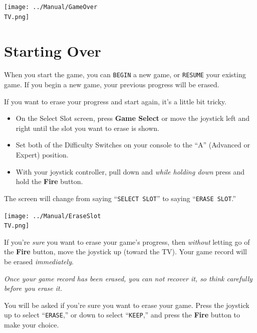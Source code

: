 \documentclass[10pt,twocolumn,openany,article]{memoir}
\newcommand\TV{NTSC}
\newcommand\TV{PAL}
\newcommand\TV{SECAM}
\begin{document}
\begin{description}
\begin{center}
  \texttt{[image: ../Manual/GameOver\\TV.png]}
\end{center}

\section{Starting Over}\label{Starting Your Adventure Over}

\ifdefined\NOSAVE

When  you  start  the  game,  you can  \texttt{BEGIN}  a  new  game,  or
\texttt{RESUME}  your existing  game.  If  you begin  a  new game,  your
previous progress will be erased.

\else

If  you want  to erase  your  progress and  start again,  it's a  little
bit tricky.

\begin{itemize}
\item On  the Select  Slot  screen,  press \textbf{Game  Select}  or move  the
  joystick left and right until the slot you want to erase is shown.
\item Set both  of the Difficulty Switches on your  console to the ``A''
  (Advanced or Expert) position.
\item With your  joystick controller, pull down  and \emph{while holding
    down} press and hold the \textbf{Fire} button.
\end{itemize}

The screen  will change from  saying ``\texttt{SELECT SLOT}''  to saying
``\texttt{ERASE SLOT}.''

\begin{center}
  \texttt{[image: ../Manual/EraseSlot\\TV.png]}
\end{center}

If  you're \emph{sure}  you want  to  erase your  game's progress,  then
\emph{without} letting go of the \textbf{Fire} button, move the joystick
up  (toward the  TV). \ifdefined\DEMO  Your game  record will  be erased
\emph{immediately}.

\emph{Once your game record has been  erased, you can not recover it, so
  think carefully before you erase it.}

\else

You will be asked if you're sure  you want to erase your game. Press the
joystick   up  to   select   ``\texttt{ERASE},''  or   down  to   select
``\texttt{KEEP},''   and  press   the  \textbf{Fire}   button  to   make
your choice.


\end{description}
\end{document}
